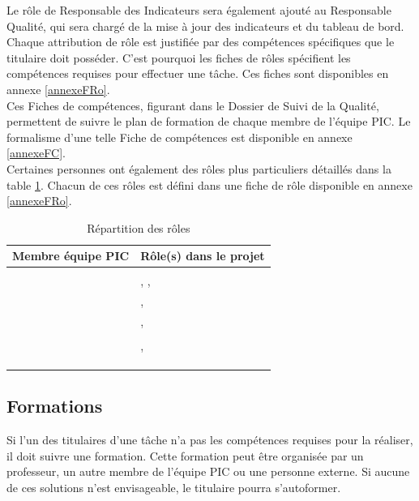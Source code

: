 \indent Le rôle de Responsable des Indicateurs sera également ajouté au Responsable Qualité, qui sera chargé de la mise à jour des indicateurs et du tableau de bord. \\

\indent Chaque attribution de rôle est justifiée par des compétences spécifiques que le titulaire doit posséder. C’est pourquoi les fiches de rôles spécifient les compétences requises pour effectuer une tâche. Ces fiches sont disponibles en annexe \ref{annexeFRo}. \\

\indent Ces Fiches de compétences, figurant dans le Dossier de Suivi de la Qualité, permettent de suivre le plan de formation de chaque membre de l’équipe PIC. Le formalisme d’une telle Fiche de compétences est disponible en annexe \ref{annexeFC}.\\

\indent Certaines personnes ont également des rôles plus particuliers détaillés dans la table \ref{repartRoles}. Chacun de ces rôles est défini dans une fiche de rôle disponible en annexe \ref{annexeFRo}.\\

\begin{table}[H]
\begin{tabular}[h]{|p{}|p{}|}
	\hline
	\rowcolor[gray]{0.85}
	Membre équipe PIC & Rôle(s) dans le projet \\\hline
	\Sergi &  \CP \\\hline
	\Pierre & \CPA, \RQ, \RI \\\hline
	\Kafui & \RQA, \D \\\hline
	\Mathieu & \RGC, \D \\\hline
	\Michel & \RD \\\hline
	\Matthieu & \RRS, \D \\\hline
	\Florian & \RS \\\hline	
	\Julie & \D \\\hline
	\Melissa & \D \\\hline
\end{tabular}
\caption{\label{repartRoles} Répartition des rôles}
\end{table}

\subsection{Formations} \label{formation}

Si l'un des titulaires d'une tâche n'a pas les compétences requises pour la réaliser, il doit suivre une formation. Cette formation peut être organisée par un professeur, un autre membre de l'équipe PIC ou une personne externe. Si aucune de ces solutions n'est envisageable, le titulaire pourra s'autoformer.\\

